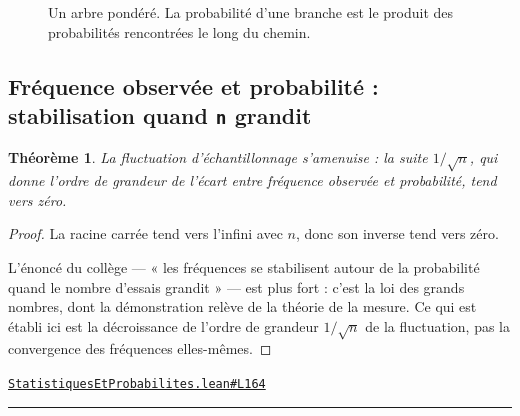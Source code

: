 \documentclass[11pt,a4paper]{article}
\theoremstyle{definition}
\theoremstyle{plain}
\newtheorem{theoreme}{Théorème}
\newcommand{\source}[2]{\par\smallskip\noindent\hfill{\footnotesize\href{#1}{\texttt{#2}}}\par\smallskip}
\begin{document}
\begin{figure}[h]
\centering

\caption{Un arbre pondéré. La probabilité d'une branche est le produit des probabilités rencontrées le long du chemin.}
\end{figure}

\subsection{Fréquence observée et probabilité : stabilisation quand \texttt{n} grandit}

\begin{theoreme}
La fluctuation d'échantillonnage s'amenuise : la suite $1/\sqrt{n}$, qui donne l'ordre
de grandeur de l'écart entre fréquence observée et probabilité, tend vers zéro.
\end{theoreme}

\begin{proof}
La racine carrée tend vers l'infini avec $n$, donc son inverse tend vers zéro.

L'énoncé du collège — « les fréquences se stabilisent autour de la probabilité quand le
nombre d'essais grandit » — est plus fort : c'est la loi des grands nombres, dont la
démonstration relève de la théorie de la mesure. Ce qui est établi ici est la décroissance
de l'ordre de grandeur $1/\sqrt{n}$ de la fluctuation, pas la convergence des fréquences
elles-mêmes.
\end{proof}
\source{https://github.com/Commutator-IO/learn-lean/blob/main/courses/01-college/06-statistiques-et-probabilites/StatistiquesEtProbabilites.lean\#L164}{StatistiquesEtProbabilites.lean\#L164}

\vfill
\noindent\rule{0.35\linewidth}{0.4pt}\par
{}
\end{document}
